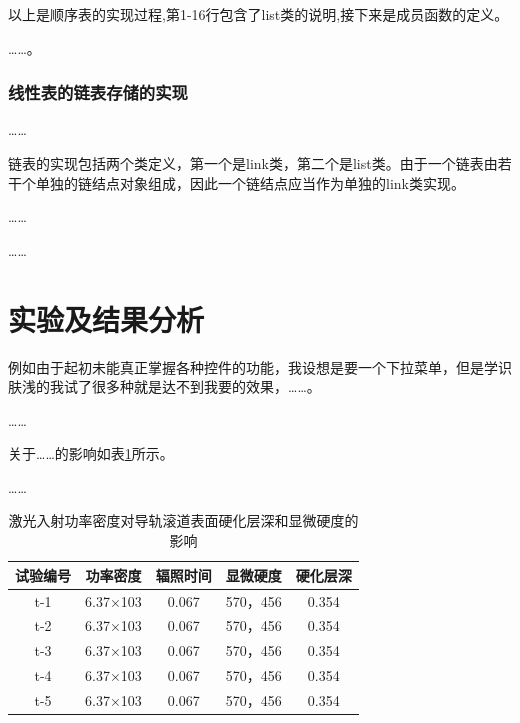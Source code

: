 以上是顺序表的实现过程,第1-16行包含了list类的说明,接下来是成员函数的定义。

……。
\subsubsection{线性表的链表存储的实现}
……

链表的实现包括两个类定义，第一个是link类，第二个是list类。由于一个链表由若干个单独的链结点对象组成，因此一个链结点应当作为单独的link类实现。

……

……

\section{实验及结果分析}
例如由于起初未能真正掌握各种控件的功能，我设想是要一个下拉菜单，但是学识肤浅的我试了很多种就是达不到我要的效果，……。

……

关于……的影响如表\ref{data_table}所示。

……

\begin{table}[htbp]
        \small
        \newcommand{\tabincell}[2]{\begin{tabular}{@{}#1@{}}#2\end{tabular}}
        \centering
        \caption{激光入射功率密度对导轨滚道表面硬化层深和显微硬度的影响}
        \begin{tabular}{ccccc}
                \toprule
                试验编号 & 功率密度 & 辐照时间 & 显微硬度       & 硬化层深\\ \midrule
                t-1	&6.37×103	&0.067	&570，456	&0.354\\
                t-2	&6.37×103	&0.067	&570，456	&0.354\\
                t-3	&6.37×103	&0.067	&570，456	&0.354\\
                t-4	&6.37×103	&0.067	&570，456	&0.354\\
                t-5	&6.37×103	&0.067	&570，456	&0.354\\ \bottomrule
        \end{tabular}
        \label{data_table}
\end{table}


